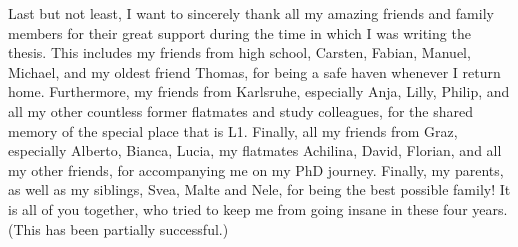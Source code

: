 \documentclass[twoside,openright,bibliography=totoc]{scrreprt}
\begin{document}
Last but not least, I want to sincerely thank all my amazing friends and family members for their great support during the time in which I was writing the thesis. 
This includes my friends from high school, Carsten, Fabian, Manuel, Michael, and my oldest friend Thomas, for being a safe haven whenever I return home. 
Furthermore, my friends from Karlsruhe, especially Anja, Lilly, Philip, and all my other countless former flatmates and study colleagues, for the shared memory of the special place that is L1. 
Finally, all my friends from Graz, especially Alberto, Bianca, Lucia, my flatmates Achilina, David, Florian, and all my other friends, for accompanying me on my PhD journey. 
Finally, my parents, as well as my siblings, Svea, Malte and Nele, for being the best possible family! It is all of you together, who tried to keep me from going insane in these four years. (This has been partially successful.)


\cleardoublepage

\setcounter{tocdepth}{1}
\tableofcontents























\end{document}
